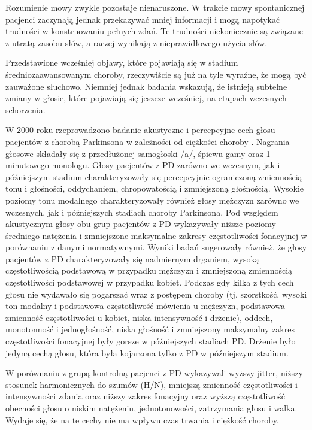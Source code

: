 Rozumienie mowy zwykle pozostaje nienaruszone.
W trakcie mowy spontanicznej pacjenci zaczynają jednak przekazywać mniej informacji i mogą napotykać trudności w konstruowaniu pełnych zdań.
Te trudności niekoniecznie są związane z utratą zasobu słów, a raczej wynikają z nieprawidłowego użycia słów.

Przedstawione wcześniej objawy, które pojawiają się w stadium średniozaawansowanym choroby, rzeczywiście są już na tyle wyraźne, że mogą być zauważone
słuchowo.
Niemniej jednak badania wskazują, że istnieją subtelne zmiany w głosie, które pojawiają się jeszcze wcześniej, na etapach wczesnych schorzenia.

W 2000 roku rzeprowadzono badanie akustyczne i percepcyjne cech głosu pacjentów z chorobą Parkinsona w zależności od
ciężkości choroby \cite{https://doi.org/10.1080/136828200410654}.
Nagrania głosowe składały się z przedłużonej samogłoski /a/, śpiewu gamy oraz 1-minutowego monologu.
Głosy pacjentów z PD zarówno we wczesnym, jak i późniejszym stadium charakteryzowały się percepcyjnie ograniczoną
zmiennością tonu i głośności, oddychaniem, chropowatością i zmniejszoną głośnością.
Wysokie poziomy tonu modalnego charakteryzowały również głosy mężczyzn zarówno we wczesnych, jak i późniejszych stadiach choroby Parkinsona.
Pod względem akustycznym głosy obu grup pacjentów z PD wykazywały niższe poziomy średniego natężenia i zmniejszone
maksymalne zakresy częstotliwości fonacyjnej w porównaniu z danymi normatywnymi.
Wyniki badań sugerowały również, że głosy pacjentów z PD charakteryzowały się nadmiernym drganiem, wysoką częstotliwością
podstawową w przypadku mężczyzn i zmniejszoną zmiennością częstotliwości podstawowej w przypadku kobiet.
Podczas gdy kilka z tych cech głosu nie wydawało się pogarszać wraz z postępem choroby (tj. szorstkość, wysoki ton modalny
i podstawowa częstotliwość mówienia u mężczyzn, podstawowa zmienność częstotliwości u kobiet, niska intensywność i drżenie),
oddech, monotonność i jednogłośność, niska głośność i zmniejszony maksymalny zakres częstotliwości fonacyjnej były gorsze w
późniejszych stadiach PD. Drżenie było jedyną cechą głosu, która była kojarzona tylko z PD w późniejszym stadium.

W porównaniu z grupą kontrolną pacjenci z PD wykazywali wyższy jitter, niższy stosunek harmonicznych do szumów (H/N),
mniejszą zmienność częstotliwości i intensywności zdania oraz niższy zakres fonacyjny oraz wyższą częstotliwość obecności
głosu o niskim natężeniu, jednotonowości, zatrzymania głosu i walka.
Wydaje się, że na te cechy nie ma wpływu czas trwania i ciężkość choroby. \cite{GAMBOA1997314}


